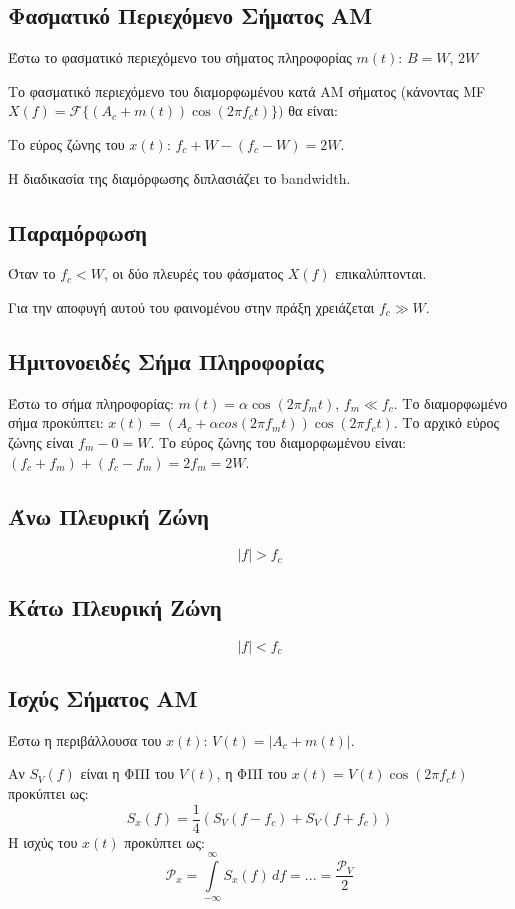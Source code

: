 \documentclass[a4paper,12pt]{article}
\begin{document}
\subsection*{Φασματικό Περιεχόμενο Σήματος AM}
Έστω το φασματικό περιεχόμενο του σήματος πληροφορίας \(m(t)\):
\(B=W\),  \(2W\)

Το φασματικό περιεχόμενο του διαμορφωμένου κατά AM σήματος (κάνοντας MF \(X(f)=\mathcal{F}\{(A_c+m(t))\cos(2 \pi f_c t)\})\) θα είναι:

Το εύρος ζώνης του \(x(t)\): \(f_c+W-(f_c-W)=2W\).

Η διαδικασία της διαμόρφωσης διπλασιάζει το bandwidth.

\subsection*{Παραμόρφωση}
Όταν το \(f_c<W\), οι δύο πλευρές του φάσματος \(X(f)\) επικαλύπτονται.

Για την αποφυγή αυτού του φαινομένου στην πράξη χρειάζεται \(f_c \gg W\).

\subsection*{Ημιτονοειδές Σήμα Πληροφορίας}
Έστω το σήμα πληροφορίας: \(m(t)=\alpha \cos(2\pi f_m t)\), \(f_m \ll f_c\). Το διαμορφωμένο σήμα προκύπτει: \(x(t)=(A_c + \alpha cos(2\pi f_m t))\cos(2 \pi f_c t)\). Το αρχικό εύρος ζώνης είναι \(f_m-0=W\). Το εύρος ζώνης του διαμορφωμένου είναι: \((f_c+f_m)+(f_c-f_m)=2f_m=2W\).

\subsection*{Άνω Πλευρική Ζώνη}
\[
|f|>f_c
\]

\subsection*{Κάτω Πλευρική Ζώνη}
\[
|f|<f_c
\]

\subsection*{Ισχύς Σήματος AM}
Έστω η περιβάλλουσα του \(x(t)\): \(V(t)=|A_c + m(t)|\).

Αν \(S_V(f)\) είναι η ΦΠΙ του \(V(t)\), η ΦΠΙ του \(x(t)=V(t)\cos (2\pi f_c t)\) προκύπτει ως:
\[
S_x(f)=\frac{1}{4}(S_V(f-f_c)+S_V(f+f_c))
\]
Η ισχύς του \(x(t)\) προκύπτει ως:
\[
\mathcal{P}_x = \int\limits^{\infty}_{-\infty} S_x(f) \, df = ... = \frac{\mathcal{P}_V}{2}
\]
\end{document}
